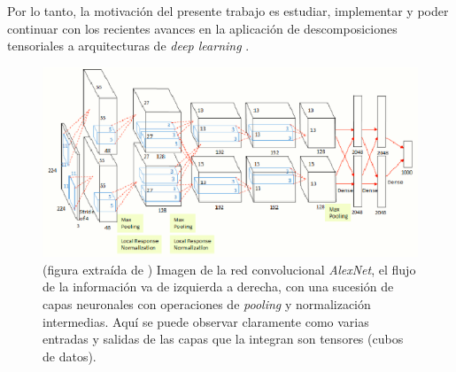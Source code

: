 \documentclass[spanish]{article}
\theoremstyle{definition}
\theoremstyle{remark}
\numberwithin{equation}{section}
\numberwithin{equation}{section} %
\begin{document}
Por lo tanto, la motivación del presente trabajo es estudiar, implementar y poder continuar con los recientes avances en la aplicación de descomposiciones tensoriales a arquitecturas de \textit{deep learning} \cite{cohen2016expressive,novikov2015tensorizing}. 
\begin{figure}[H]
\centering
\includegraphics[width=12cm]{img/imagenet}
\caption[Alexnet]{\footnotesize{ (figura extraída de \cite{krizhevsky2012imagenet})  Imagen de la  red convolucional \textit{AlexNet}, el flujo de la información va de izquierda a derecha, con una sucesión de capas neuronales con operaciones de {\it pooling} y normalización intermedias. Aquí se puede observar claramente como varias entradas y salidas de las capas que la integran son tensores (cubos de datos).
}} 
\label{fig:imagenet}
\end{figure}      
\end{document}

